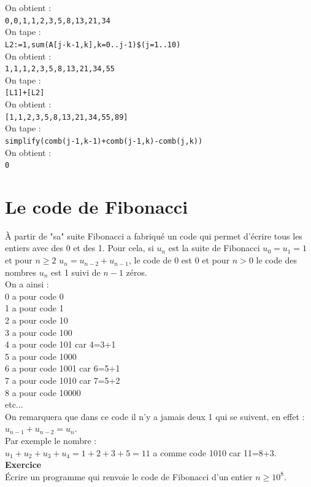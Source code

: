 \documentclass[a4paper,11pt]{book}
\begin{document}
On obtient :\\
{\tt 0,0,1,1,2,3,5,8,13,21,34}\\
On tape :\\
{\tt L2:=1,sum(A[j-k-1,k],k=0..j-1)\$(j=1..10)}\\
On obtient :\\
{\tt 1,1,1,2,3,5,8,13,21,34,55}\\
On tape :\\
{\tt [L1]+[L2]}\\
On obtient :\\
{\tt [1,1,2,3,5,8,13,21,34,55,89]}\\
On tape :\\
{\tt simplify(comb(j-1,k-1)+comb(j-1,k)-comb(j,k))}\\
On obtient :\\
{\tt 0}
\section{Le code de Fibonacci}
\`A partir de "sa" suite Fibonacci a fabriqu\'e un code qui permet d'\'ecrire 
tous les entiers avec des 0 et des 1. Pour cela, si $u_n$ est la suite de 
Fibonacci  $u_0=u_1=1$ et pour $n\geq2$ $u_n=u_{n-2}+u_{n-1}$,
le code de 0 est 0 et pour $n>0$ le code des nombres $u_n$ est 1 suivi de $n-1$ z\'eros.\\
On a ainsi :\\
0 a pour code 0\\
1 a pour code 1\\
2 a pour code 10\\
3 a pour code 100\\
4 a pour code 101 car 4=3+1\\
5 a pour code 1000\\
6 a pour code 1001 car 6=5+1\\
7 a pour code 1010 car 7=5+2\\
8 a pour code 10000\\
etc...\\
On remarquera que dans ce code il n'y a jamais deux 1 qui se suivent, en effet :\\ 
$u_{n-1}+u_{n-2}=u_n$. \\
Par exemple le nombre :\\
$u_1+u_2+u_3+u_4=1+2+3+5=11$ a comme code 1010 car 11=8+3.\\
{\bf Exercice}\\
\'Ecrire un programme qui renvoie le code de Fibonacci d'un entier $n\geq 10^8$.\\
\end{document}

